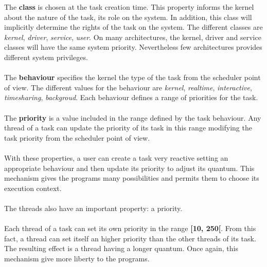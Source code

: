 \documentclass[10pt,a4wide]{article}
\begin{document}
\begin{multicols}{2}
The \textbf{class} is chosen at the task creation time. This property
informs the kernel about the nature of the task, its role on the system.
In addition, this class will implicitly determine the rights of the task
on the system. The different classes are \textit{kernel}, \textit{driver},
\textit{service}, \textit{user}. On many architectures, the kernel, driver
and service classes will have the same system priority. Nevertheless few
architectures provides different system privileges.

\paragraph{}

The \textbf{behaviour} specifies the kernel the type of the task from the
scheduler point of view. The different values for the behaviour are
\textit{kernel}, \textit{realtime}, \textit{interactive}, \textit{timesharing},
\textit{backgroud}. Each behaviour defines a range of priorities for the
task.

\paragraph{}

The \textbf{priority} is a value included in the range defined by the
task behaviour. Any thread of a task can update the priority of its
task in this range modifying the task priority from the scheduler point of view.

\paragraph{}

With these properties, a user can create a task very reactive setting an
appropriate behaviour and then update its priority to adjust its quantum.
This mechanism gives the programs many possibilities and permits them to
choose its execution context.

\paragraph{}

The threads also have an important property: a priority.

\paragraph{}

Each thread of a task can set its own priority in the range \textbf{[10, 250[}.
From this fact, a thread can set itself an higher priority than the other
threads of its task. The resulting effect is a thread having a longer quantum.
Once again, this mechanism give more liberty to the programs.


\end{multicols}
\end{document}
